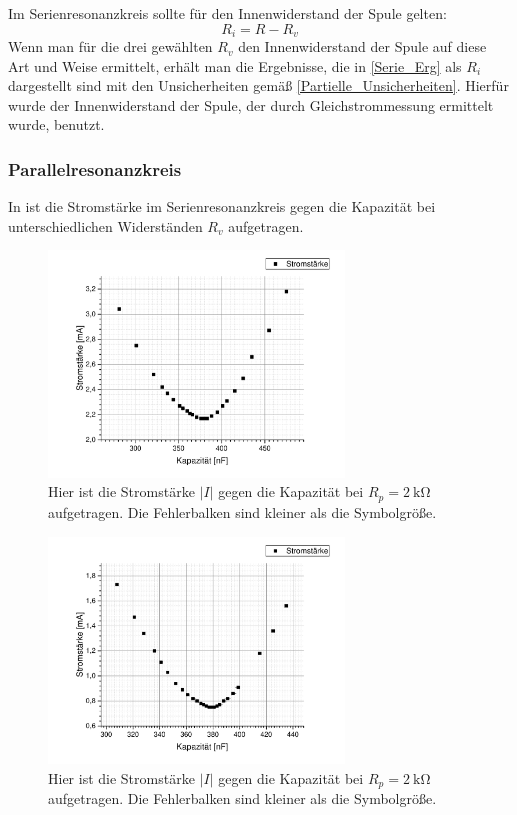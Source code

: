 \documentclass[
	a4paper,
	12pt,
	pagesize,
	ngerman
]{scrartcl}
\begin{document}
	Im Serienresonanzkreis sollte für den Innenwiderstand der Spule gelten:
	\begin{equation}
		R_i=R-R_v
		\label{Verlust}
	\end{equation}
	Wenn man für die drei gewählten $R_v$ den Innenwiderstand der Spule auf diese Art und Weise ermittelt, erhält man die Ergebnisse, die in \cref{Serie_Erg} als $R_i$ dargestellt sind mit den Unsicherheiten gemäß \cref{Partielle_Unsicherheiten}.
	Hierfür wurde der Innenwiderstand der Spule, der durch Gleichstrommessung ermittelt wurde, benutzt.
	\subsubsection{Parallelresonanzkreis}
	
	In  ist die Stromstärke im Serienresonanzkreis gegen die Kapazität bei unterschiedlichen Widerständen $ R_v $ aufgetragen.
	\begin{figure}[H]
		\includegraphics[width=0.7\textwidth]{Parallelstromkreis_2k}
		\centering
		\caption{Hier ist die Stromstärke $ \left| I \right| $ gegen die Kapazität bei $ R_p = \SI{2}{\kilo \ohm} $ aufgetragen. Die Fehlerbalken sind kleiner als die Symbolgröße.}
		\label{Para_2k}
		\centering
	\end{figure} 
	\begin{figure}[H]
		\includegraphics[width=0.7\textwidth]{Parallelstromkreis_10k}
		\centering
		\caption{Hier ist die Stromstärke $ \left| I \right| $ gegen die Kapazität bei $ R_p = \SI{2}{\kilo \ohm} $ aufgetragen. Die Fehlerbalken sind kleiner als die Symbolgröße.}
		\label{Para_10k}
		\centering
	\end{figure} 
\end{document}

